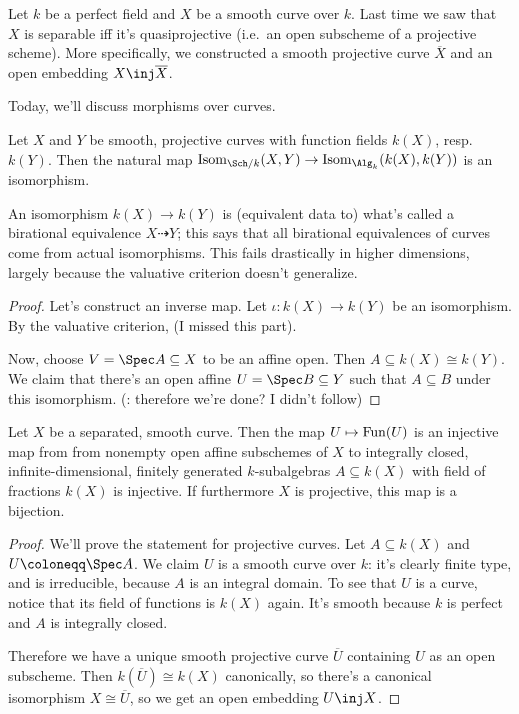 Let $k$ be a perfect field and $X$ be a smooth curve over $k$. Last time we saw that $X$ is separable iff it's
quasiprojective (i.e.\ an open subscheme of a projective scheme). More specifically, we constructed a smooth
projective curve $\overline X$ and an open embedding $X\inj\overline X$.

Today, we'll discuss morphisms over curves.
\begin{prop}
\label{curvesarefield}
Let $X$ and $Y$ be smooth, projective curves with function fields $k(X)$, resp.\ $k(Y)$. Then the natural map
$\mathrm{Isom}_{\Sch/k}(X,Y)\to \mathrm{Isom}_{\Alg_k}(k(X), k(Y))$ is an isomorphism.
\end{prop}
An isomorphism $k(X)\to k(Y)$ is (equivalent data to) what's called a birational equivalence $X\dashrightarrow Y$;
this says that all birational equivalences of curves come from actual isomorphisms. This fails drastically in
higher dimensions, largely because the valuative criterion doesn't generalize.
\begin{proof}
Let's construct an inverse map. Let $\iota\colon k(X)\to k(Y)$ be an isomorphism. By the valuative criterion, \TODO
(I missed this part).

Now, choose $V = \Spec A\subseteq X$ to be an affine open. Then $A\subseteq k(X)\cong k(Y)$. We claim that there's
an open affine $U = \Spec B\subseteq Y$ such that $A\subseteq B$ under this isomorphism. (\TODO: therefore we're
done? I didn't follow)
\end{proof}
\begin{prop}
Let $X$ be a separated, smooth curve. Then the map $U\mapsto\mathrm{Fun}(U)$ is an injective map from from nonempty open
affine subschemes of $X$ to integrally closed, infinite-dimensional, finitely generated $k$-subalgebras $A\subseteq
k(X)$ with field of fractions $k(X)$ is injective. If furthermore $X$ is projective, this map is a bijection.
\end{prop}
\begin{proof}
We'll prove the statement for projective curves. Let $A\subseteq k(X)$ and $U\coloneqq\Spec A$. We claim $U$ is a
smooth curve over $k$: it's clearly finite type, and is irreducible, because $A$ is an integral domain. To see that
$U$ is a curve, notice that its field of functions is $k(X)$ again. It's smooth because $k$ is perfect and $A$ is
integrally closed.

Therefore we have a unique smooth projective curve $\overline U$ containing $U$ as an open subscheme. Then
$k(\overline U)\cong k(X)$ canonically, so there's a canonical isomorphism $X\cong\overline U$, so we get an open
embedding $U\inj X$.
\end{proof}
